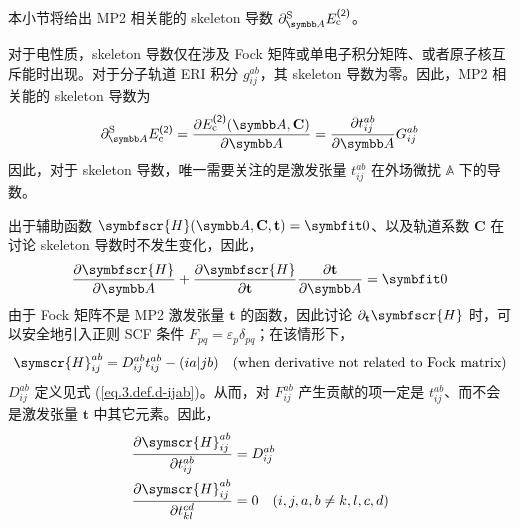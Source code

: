 本小节将给出 MP2 相关能的 skeleton 导数 $\partial_\mathbb{A}^\mathrm{S} E_\mathrm{c}^\textmt{(2)}$。

对于电性质，skeleton 导数仅在涉及 Fock 矩阵或单电子积分矩阵、或者原子核互斥能时出现。对于分子轨道 ERI 积分 $g_{ij}^{ab}$，其 skeleton 导数为零。因此，MP2 相关能的 skeleton 导数为
\begin{equation}
    \label{eq.3.pdSA-Ec-MP2-0}
    \partial_\mathbb{A}^\mathrm{S} E_\mathrm{c}^\textmt{(2)} = \frac{\partial E_\mathrm{c}^\textmt{(2)} (\mathbb{A}, \mathbf{C})}{\partial \mathbb{A}} = \frac{\partial t_{ij}^{ab}}{\partial \mathbb{A}} G_{ij}^{ab}
\end{equation}
因此，对于 skeleton 导数，唯一需要关注的是激发张量 $t_{ij}^{ab}$ 在外场微扰 $\mathbb{A}$ 下的导数。

出于辅助函数 $\symbfscr{H} (\mathbb{A}, \mathbf{C}, \mathbf{t}) = \bm{0}$、以及轨道系数 $\mathbf{C}$ 在讨论 skeleton 导数时不发生变化，因此，
\begin{equation}
    \label{eq.3.auxfunc-pdA}
    \frac{\partial \symbfscr{H}}{\partial \mathbb{A}} + \frac{\partial \symbfscr{H}}{\partial \mathbf{t}} \frac{\partial \mathbf{t}}{\partial \mathbb{A}} = \bm{0}
\end{equation}
由于 Fock 矩阵不是 MP2 激发张量 $\mathbf{t}$ 的函数，因此讨论 $\partial_\mathbf{t} \symbfscr{H}$ 时，可以安全地引入正则 SCF 条件 $F_{pq} = \varepsilon_p \delta_{pq}$；在该情形下，
\begin{equation*}
    \symscr{H}_{ij}^{ab} = D_{ij}^{ab} t_{ij}^{ab} - (ia|jb) \quad \text{(when derivative not related to Fock matrix)}
\end{equation*}
$D_{ij}^{ab}$ 定义见式 (\ref{eq.3.def.d-ijab})。从而，对 $F_{ij}^{ab}$ 产生贡献的项一定是 $t_{ij}^{ab}$、而不会是激发张量 $\mathbf{t}$ 中其它元素。因此，
\begin{align}
    \label{eq.3.auxfunc-pdt}
    \frac{\partial \symscr{H}_{ij}^{ab}}{\partial t_{ij}^{ab}} &= D_{ij}^{ab} \\
    \frac{\partial \symscr{H}_{ij}^{ab}}{\partial t_{kl}^{cd}} &= 0 \quad (i,j,a,b \neq k,l,c,d)
\end{align}

